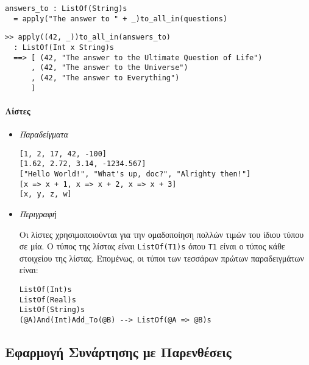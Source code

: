 \documentclass[diploma]{softlab-thesis}
\begin{document}
\begin{itemize}
\begin{verbatim}
answers_to : ListOf(String)s
  = apply("The answer to " + _)to_all_in(questions)
\end{verbatim}

\begin{verbatim}
>> apply((42, _))to_all_in(answers_to)
  : ListOf(Int x String)s
  ==> [ (42, "The answer to the Ultimate Question of Life")
      , (42, "The answer to the Universe")
      , (42, "The answer to Everything")
      ]
\end{verbatim}

\end{itemize}

\paragraph{Λίστες}

\begin{itemize}

\item \textit{Παραδείγματα}
\begin{verbatim}
[1, 2, 17, 42, -100]
[1.62, 2.72, 3.14, -1234.567]
["Hello World!", "What's up, doc?", "Alrighty then!"]
[x => x + 1, x => x + 2, x => x + 3]
[x, y, z, w]
\end{verbatim}

\item \textit{Περιγραφή}

Οι λίστες χρησιμοποιούνται για την ομαδοποίηση πολλών τιμών του ίδιου τύπου σε
μία.  Ο τύπος της λίστας είναι \verb|ListOf(T1)s| όπου \verb|T1| είναι ο τύπος
κάθε στοιχείου της λίστας.  Επομένως, οι τύποι των τεσσάρων πρώτων
παραδειγμάτων είναι:
\begin{verbatim}
ListOf(Int)s
ListOf(Real)s
ListOf(String)s
(@A)And(Int)Add_To(@B) --> ListOf(@A => @B)s
\end{verbatim}

\end{itemize}

\subsection{Εφαρμογή Συνάρτησης με Παρενθέσεις}
\label{subsubsec:parenfuncappgr}
\end{document}
